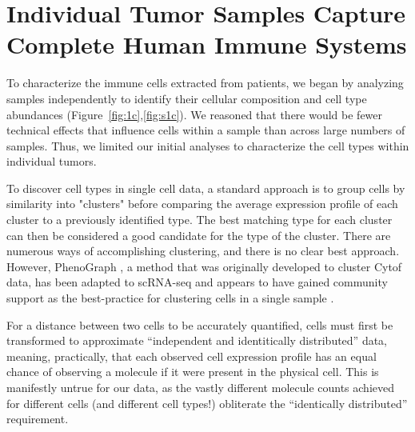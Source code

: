 \section{Individual Tumor Samples Capture Complete Human Immune Systems}

To characterize the immune cells extracted from patients, we began by analyzing samples independently to identify their cellular composition and cell type abundances (Figure~\ref{fig:1c},\ref{fig:s1c}).
We reasoned that there would be fewer technical effects that influence cells within a sample than across large numbers of samples. 
Thus, we limited our initial analyses to characterize the cell types within individual tumors. 

To discover cell types in single cell data, a standard approach is to group cells by similarity into "clusters" before comparing the average expression profile of each cluster to a previously identified type.
The best matching type for each cluster can then be considered a good candidate for the type of the cluster. 
There are numerous ways of accomplishing clustering, and there is no clear best approach. 
However, PhenoGraph \citep{Levine2015}, a method that was originally developed to cluster Cytof data, has been adapted to scRNA-seq and appears to have gained community support as the best-practice for clustering cells in a single sample \cite{Shekhar2016,Butler2017}. 

For a distance between two cells to be accurately quantified, cells must first be transformed to approximate ``independent and identitically distributed'' data, meaning, practically, that each observed cell expression profile has an equal chance of observing a molecule if it were present in the physical cell. 
This is manifestly untrue for our data, as the vastly different molecule counts achieved for different cells (and different cell types!) obliterate the ``identically distributed'' requirement. %


